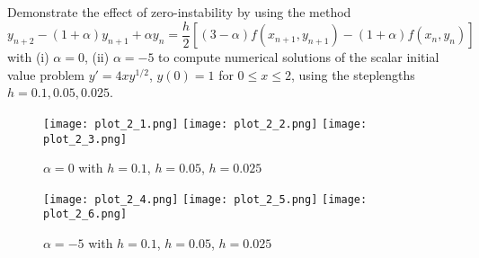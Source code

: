 \begin{problem}[L 2.5.4]
  Demonstrate the effect of zero-instability by using the method
  \[
    y_{n + 2} - (1 + \alpha)y_{n + 1} + \alpha y_n = \frac{h}{2}\left[(3-\alpha) f(x_{n+1}, y_{n+1}) - (1 + \alpha) f(x_n, y_n)\right]
  \]
  with (i) $\alpha = 0$, (ii) $\alpha = -5$ to compute numerical solutions of the scalar initial value problem $y' = 4xy^{1/2}$, $y(0) = 1$ for $0 \leq x \leq 2$, using the steplengths $h = 0.1, 0.05, 0.025$.
\end{problem}

\begin{solution}
  \begin{figure}[!ht]
    \centering
    \texttt{[image: plot\_2\_1.png]}
    \texttt{[image: plot\_2\_2.png]}
    \texttt{[image: plot\_2\_3.png]}
    \caption{$\alpha = 0$ with $h = 0.1$, $h = 0.05$, $h = 0.025$}
    \label{fig:prob2_1}
  \end{figure}
  \begin{figure}[!ht]
    \centering
    \texttt{[image: plot\_2\_4.png]}
    \texttt{[image: plot\_2\_5.png]}
    \texttt{[image: plot\_2\_6.png]}
    \caption{$\alpha = -5$ with $h = 0.1$, $h = 0.05$, $h = 0.025$}
    \label{fig:prob2_2}
  \end{figure}
\end{solution}
